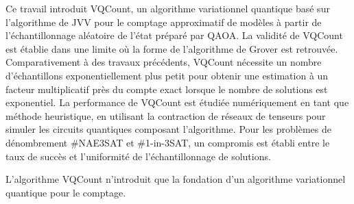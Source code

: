 \Conclusion %


Ce travail introduit VQCount, un algorithme variationnel quantique basé sur l'algorithme de JVV pour le comptage approximatif de modèles à partir de l'échantillonnage aléatoire de l'état préparé par QAOA. La validité de VQCount est établie dans une limite où la forme de l'algorithme de Grover est retrouvée. Comparativement à des travaux précédents, VQCount nécessite un nombre d'échantillons exponentiellement plus petit pour obtenir une estimation à un facteur multiplicatif près du compte exact lorsque le nombre de solutions est exponentiel. La performance de VQCount est étudiée numériquement en tant que méthode heuristique, en utilisant la contraction de réseaux de tenseurs pour simuler les circuits quantiques composant l'algorithme. Pour les problèmes de dénombrement \#NAE3SAT et \#1-in-3SAT, un compromis est établi entre le taux de succès et l'uniformité de l'échantillonnage de solutions. 





L'algorithme VQCount n'introduit que la fondation d'un algorithme variationnel quantique pour le comptage. 


